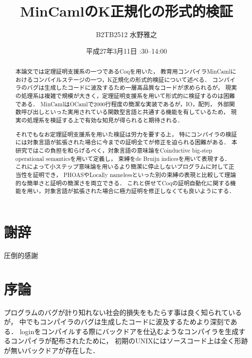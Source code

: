 \documentclass{sumiilab-paper}
\title{MinCamlのK正規化の形式的検証}
\author{B2TB2512 水野雅之}
\institute{東北大学 工学部\\情報知能システム総合学科}%
\date{平成27年3月11日 \quad 13:30--14:00}
\begin{document}
\maketitle

\begin{abstract}
本論文では定理証明支援系の一つであるCoqを用いた，
教育用コンパイラMinCamlにおけるコンパイルステージの一つ，K正規化の形式的検証について述べる．
コンパイラのバグは生成したコードに波及するため一層高品質なコードが求められるが，
現実の処理系は複雑で規模が大きく，定理証明支援系を用いて形式的に検証するのは困難である．
MinCamlはOCamlで2000行程度の簡潔な実装であるが，IO，配列，
外部関数呼び出しといった実用されている関数型言語と共通する機能を有しているため，
現実の処理系を検証する上で有効な知見が得られると期待される．

それでもなお定理証明支援系を用いた検証は労力を要する上，
特にコンパイラの検証には対象言語が拡張された場合に今までの証明全てが修正を迫られる困難がある．
本研究ではこの負担を和らげるべく，対象言語の意味論をCoinductive big-step operational semanticsを用いて定義し，
束縛をde Bruijn indicesを用いて表現する．
これによって小ステップ意味論を用いるより簡潔に停止しないプログラムに対して正当性を証明でき，
PHOASやLocally namelessといった別の束縛の表現と比較して理論的な簡単さと証明の簡潔さを両立できる．
これと併せてCoqの証明自動化に関する機能を用い，対象言語が拡張された場合に極力証明を修正しなくても良いようにする．
\end{abstract}

\chapter*{謝辞}

圧倒的感謝

\tableofcontents


\chapter{序論}


プログラムのバグが計り知れない社会的損失をもたらす事は良く知られているが，
中でもコンパイラのバグは生成したコードに波及するためより深刻である．
loginをコンパイルする際にバックドアを仕込むようなコンパイラを生成するコンパイラが配布されたために，
初期のUNIXにはソースコード上は全く形跡が無いバックドアが存在した．\cite{DBLP:journals/cacm/Thompson84}
\end{document}
